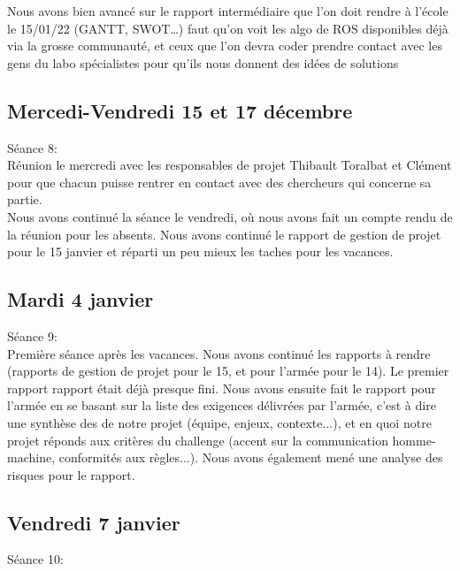 \documentclass[11pt]{article}
\begin{document}
Nous avons bien avancé sur le rapport intermédiaire que l’on doit rendre à l’école le 15/01/22 (GANTT, SWOT…)
faut qu’on voit les algo de ROS disponibles déjà via la grosse communauté, et ceux que l’on devra coder
prendre contact avec les gens du labo spécialistes pour qu’ils nous donnent des idées de solutions


\subsection{Mercedi-Vendredi 15 et 17 décembre}

Séance 8: \\

Réunion le mercredi avec les responsables de projet Thibault Toralbat et Clément pour que chacun puisse rentrer en contact avec des chercheurs qui concerne sa partie.\\
Nous avons continué la séance le vendredi, où nous avons fait un compte rendu de la réunion pour les absents. Nous avons continué le rapport de gestion de projet pour le 15 janvier et réparti un peu mieux les taches pour les vacances.


\subsection{Mardi 4 janvier}

Séance 9: \\

Première séance après les vacances. Nous avons continué les rapports à rendre (rapports de gestion de projet pour le 15, et pour l'armée pour le 14). Le premier rapport rapport était déjà presque fini. Nous avons ensuite fait le rapport pour l'armée en se basant sur la liste des exigences délivrées par l'armée, c'est à dire une synthèse des de notre projet (équipe, enjeux, contexte...), et en quoi notre projet réponds aux critères du challenge (accent sur la communication homme-machine, conformités aux règles...). Nous avons également mené une analyse des risques pour le rapport.  


\subsection{Vendredi 7 janvier}

Séance 10:
\end{document}
